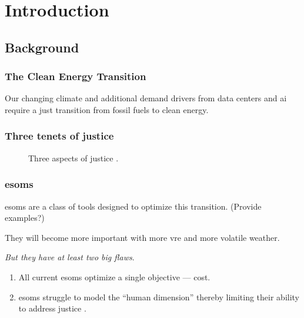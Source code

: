 \section{Introduction}

\subsection{Background}
\begin{frame}
    \frametitle{The Clean Energy Transition}
    Our changing climate and additional demand drivers from data 
    centers and \gls{ai} require a just transition from fossil 
    fuels to clean energy.
\end{frame}

\begin{frame}
    \frametitle{Three tenets of justice}
    \begin{figure}
        \centering

        \caption{Three aspects of justice \cite{schlosberg_1_2007}.}
    \end{figure}
\end{frame}

\begin{frame}
    \frametitle{\glspl{esom}}
    \Glspl{esom} are a class of tools designed to 
    optimize this transition. (Provide examples?)

    They will become more important with more \gls{vre}
    and more volatile weather.

    \textit{But they have at least two big flaws}.
    \begin{enumerate}
        \item All current \glspl{esom} optimize a single objective --- cost.
        \item \glspl{esom} struggle to model the ``human dimension'' thereby
        limiting their ability to address justice \cite{pfenninger_energy_2014}.

    \end{enumerate}
\end{frame}

